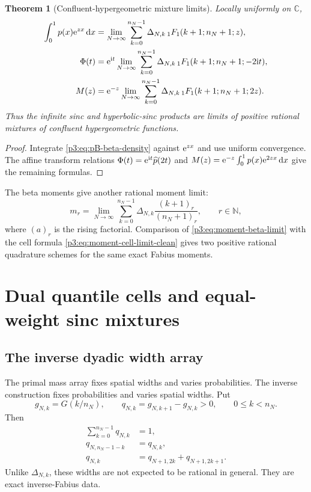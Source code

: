 \documentclass[11pt]{article}
\newtheorem{theorem}{Theorem}[section]
\theoremstyle{definition}
\theoremstyle{remark}
\newcommand{\C}{\mathbb C}
\newcommand{\N}{\mathbb N}
\newcommand{\dd}{\,\mathrm d}
\begin{document}
\begin{theorem}[Confluent-hypergeometric mixture limits]
\label{p3:thm:hypergeometric-mixture}
Locally uniformly on $\C$,
\begin{align}
 \int_0^1p(x)\e^{zx}\dd x
 &=\lim_{N\to\infty}\sum_{k=0}^{n_N-1}
 \Delta_{N,k}\,{}_1F_1(k+1;n_N+1;z),
 \label{p3:eq:p-MGF-beta}\\
 \Phi(t)
 &=\e^{\ii t}\lim_{N\to\infty}\sum_{k=0}^{n_N-1}
 \Delta_{N,k}\,{}_1F_1(k+1;n_N+1;-2\ii t),
 \label{p3:eq:Phi-beta}\\
 M(z)
 &=\e^{-z}\lim_{N\to\infty}\sum_{k=0}^{n_N-1}
 \Delta_{N,k}\,{}_1F_1(k+1;n_N+1;2z).
 \label{p3:eq:M-beta}
\end{align}
Thus the infinite sinc and hyperbolic-sinc products are limits of positive
rational mixtures of confluent hypergeometric functions.
\end{theorem}

\begin{proof}
Integrate \eqref{p3:eq:pB-beta-density} against $\mathrm e^{zx}$ and use uniform
convergence.  The affine transform relations
$\Phi(t)=\mathrm e^{\mathrm i t}\widehat p(2t)$ and
$M(z)=\e^{-z}\int_0^1p(x)\e^{2zx}\dd x$ give the remaining formulas.
\end{proof}

The beta moments give another rational moment limit:
\begin{equation}\label{p3:eq:moment-beta-limit}
 m_r=\lim_{N\to\infty}
 \sum_{k=0}^{n_N-1}\Delta_{N,k}
 \frac{(k+1)_r}{(n_N+1)_r},
 \qquad r\in\N,
\end{equation}
where $(a)_r$ is the rising factorial.  Comparison of
\eqref{p3:eq:moment-beta-limit} with the cell formula
\eqref{p3:eq:moment-cell-limit-clean} gives two positive rational quadrature
schemes for the same exact Fabius moments.

\section{Dual quantile cells and equal-weight sinc mixtures}
\label{p3:sec:quantile-cells}

\subsection{The inverse dyadic width array}

The primal mass array fixes spatial widths and varies probabilities.  The
inverse construction fixes probabilities and varies spatial widths.  Put
\begin{equation}\label{p3:eq:gNk-qNk}
 g_{N,k}=G(k/n_N),
 \qquad
 q_{N,k}=g_{N,k+1}-g_{N,k}>0,
 \qquad 0\le k<n_N.
\end{equation}
Then
\begin{align}
 \sum_{k=0}^{n_N-1}q_{N,k}&=1,\label{p3:eq:q-sum}\\
 q_{N,n_N-1-k}&=q_{N,k},\label{p3:eq:q-symmetry}\\
 q_{N,k}&=q_{N+1,2k}+q_{N+1,2k+1}.
 \label{p3:eq:q-projective}
\end{align}
Unlike $\Delta_{N,k}$, these widths are not expected to be rational in general.
They are exact inverse-Fabius data.
\end{document}
